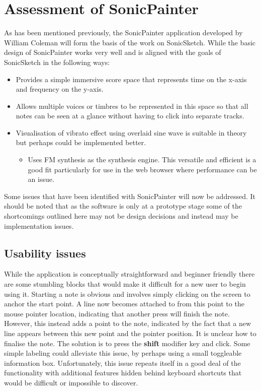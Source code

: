 \documentclass[12pt]{report}
\begin{document}
\chapter{Assessment of SonicPainter}
\label{sec:orgcb78f75}
As has been mentioned previously, the SonicPainter application developed by
William Coleman will form the basis of the work on SonicSketch. While the basic
design of SonicPainter works very well and is aligned with the goals of
SonicSketch in the following ways:
\begin{itemize}
\item Provides a simple immersive score space that represents time on the x-axis and frequency on the y-axis.
\item Allows multiple voices or timbres to be represented in this space so that all
notes can be seen at a glance without having to click into separate tracks.
\end{itemize}
\begin{itemize}
\item Visualisation of vibrato effect using overlaid sine wave is suitable in theory
but perhaps could be implemented better.
\begin{itemize}
\item Uses FM synthesis as the synthesis engine. This versatile and efficient is a
good fit particularly for use in the web browser where performance can be an
issue.
\end{itemize}
\end{itemize}
Some issues that have been identified with SonicPainter will now be addressed.
It should be noted that as the software is only at a prototype stage some of the
shortcomings outlined here may not be design decisions and instead may be
implementation issues.

\section{Usability issues}
\label{sec:org7cf97ca}
While the application is conceptually straightforward and beginner friendly
there are some stumbling blocks that would make it difficult for a new user to
begin using it. Starting a note is obvious and involves simply clicking on the
screen to anchor the start point. A line now becomes attached to from this point
to the mouse pointer location, indicating that another press will finish the
note. However, this instead adds a point to the note, indicated by the fact that
a new line appears between this new point and the pointer position. It is
unclear how to finalise the note. The solution is to press the \textbf{shift} modifier
key and click. Some simple labeling could alleviate this issue, by perhaps using
a small toggleable information box. Unfortunately, this issue repeats itself in
a good deal of the functionality with additional features hidden behind keyboard
shortcuts that would be difficult or impossible to discover.
\end{document}
